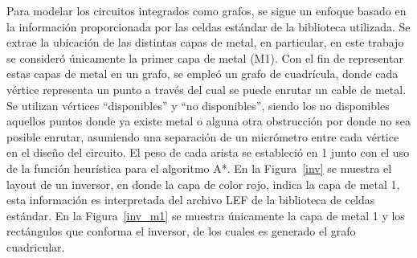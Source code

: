 \documentclass[reprint,amsmath,amssymb,aps]{revtex4-2}
\begin{document}
Para modelar los circuitos integrados como grafos, se sigue un enfoque basado en la información proporcionada por las celdas estándar de la biblioteca utilizada. Se extrae la ubicación de las distintas capas de metal, en particular, en este trabajo se consideró únicamente la primer capa de metal (M1). Con el fin de representar estas capas de metal en un grafo, se empleó un grafo de cuadrícula, donde cada vértice representa un punto a través del cual se puede enrutar un cable de metal. Se utilizan vértices ``disponibles'' y ``no disponibles'', siendo los no disponibles aquellos puntos donde ya existe metal o alguna otra obstrucción por donde no sea posible enrutar, asumiendo una separación de un micrómetro entre cada vértice en el diseño del circuito. El peso de cada arista se estableció en 1 junto con el uso de la función heurística para el algoritmo A*. En la Figura~\ref{inv} se muestra el layout de un inversor, en donde la capa de color rojo, indica la capa de metal 1, esta información es interpretada del archivo LEF de la biblioteca de celdas estándar. En la Figura~\ref{inv_m1} se muestra únicamente la capa de metal 1 y los rectángulos que conforma el inversor, de los cuales es generado el grafo cuadricular.
\end{document}
